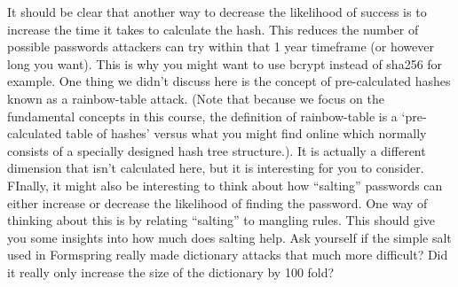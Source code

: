 It should be clear that another way to decrease the likelihood of success is to increase the time it takes to calculate the hash. This reduces the number of possible passwords attackers can try within that 1 year timeframe (or however long you want). This is why you might want to use bcrypt instead of sha256 for example.
One thing we didn’t discuss here is the concept of pre-calculated hashes known as a rainbow-table attack. (Note that because we focus on the fundamental concepts in this course, the definition of rainbow-table is a ‘pre-calculated table of hashes’ versus what you might find online which normally consists of a specially designed hash tree structure.). It is actually a different dimension that isn’t calculated here, but it is interesting for you to consider.
FInally, it might also be interesting to think about how “salting” passwords can either increase or decrease the likelihood of finding the password. One way of thinking about this is by relating “salting” to mangling rules. This should give you some insights into how much does salting help. Ask yourself if the simple salt used in Formspring really made dictionary attacks that much more difficult? Did it really only increase the size of the dictionary by 100 fold?

